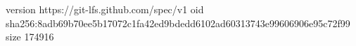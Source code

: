 version https://git-lfs.github.com/spec/v1
oid sha256:8adb69b70ee5b17072c1fa42ed9bdedd6102ad60313743e99606906e95c72f99
size 174916
